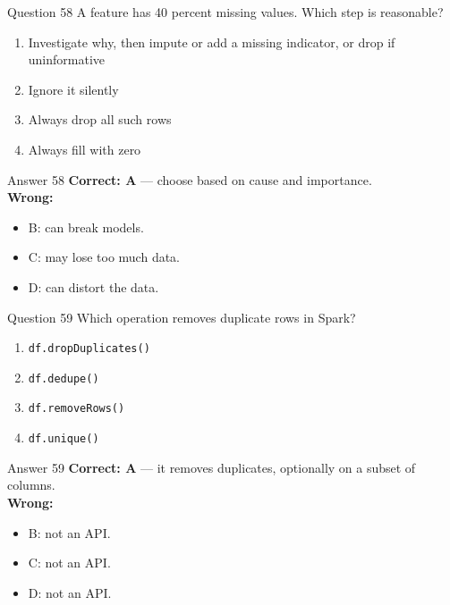 \documentclass[aspectratio=169,11pt]{beamer}
\begin{document}
\begin{frame}{Question 58}
A feature has 40 percent missing values. Which step is reasonable?
\begin{enumerate}[label=\Alph*.]
\item Investigate why, then impute or add a missing indicator, or drop if uninformative
\item Ignore it silently
\item Always drop all such rows
\item Always fill with zero
\end{enumerate}
\end{frame}
\begin{frame}{Answer 58}
\textbf{Correct: A} --- choose based on cause and importance.\\
\vspace{0.5em}
\textbf{Wrong:}
\begin{itemize}
\item B: can break models.
\item C: may lose too much data.
\item D: can distort the data.
\end{itemize}
\end{frame}

\begin{frame}{Question 59}
Which operation removes duplicate rows in Spark?
\begin{enumerate}[label=\Alph*.]
\item \texttt{df.dropDuplicates()}
\item \texttt{df.dedupe()}
\item \texttt{df.removeRows()}
\item \texttt{df.unique()}
\end{enumerate}
\end{frame}
\begin{frame}{Answer 59}
\textbf{Correct: A} --- it removes duplicates, optionally on a subset of columns.\\
\vspace{0.5em}
\textbf{Wrong:}
\begin{itemize}
\item B: not an API.
\item C: not an API.
\item D: not an API.
\end{itemize}
\end{frame}
\end{document}
